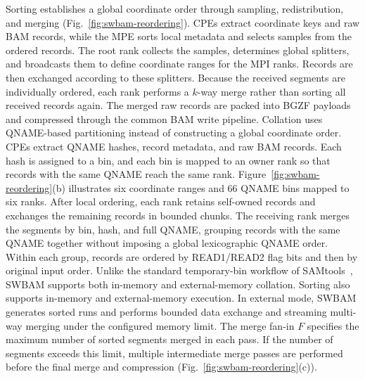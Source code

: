 \documentclass[lettersize,journal]{IEEEtran}
\begin{document}
Sorting establishes a global coordinate order through sampling, redistribution, and merging (Fig.~\ref{fig:swbam-reordering}).
CPEs extract coordinate keys and raw BAM records, while the MPE sorts local metadata and selects samples from the ordered records.
The root rank collects the samples, determines global splitters, and broadcasts them to define coordinate ranges for the MPI ranks.
Records are then exchanged according to these splitters.
Because the received segments are individually ordered, each rank performs a $k$-way merge rather than sorting all received records again.
The merged raw records are packed into BGZF payloads and compressed through the common BAM write pipeline.
Collation uses QNAME-based partitioning instead of constructing a global coordinate order.
CPEs extract QNAME hashes, record metadata, and raw BAM records.
Each hash is assigned to a bin, and each bin is mapped to an owner rank so that records with the same QNAME reach the same rank.
Figure~\ref{fig:swbam-reordering}(b) illustrates six coordinate ranges and 66 QNAME bins mapped to six ranks.
After local ordering, each rank retains self-owned records and exchanges the remaining records in bounded chunks.
The receiving rank merges the segments by bin, hash, and full QNAME, grouping records with the same QNAME together without imposing a global lexicographic QNAME order.
Within each group, records are ordered by READ1/READ2 flag bits and then by original input order.
Unlike the standard temporary-bin workflow of SAMtools~\cite{danecek2021samtools}, SWBAM supports both in-memory and external-memory collation.
Sorting also supports in-memory and external-memory execution.
In external mode, SWBAM generates sorted runs and performs bounded data exchange and streaming multi-way merging under the configured memory limit.
The merge fan-in \(F\) specifies the maximum number of sorted segments merged in each pass. 
If the number of segments exceeds this limit, multiple intermediate merge passes are performed before the final merge and compression (Fig.~\ref{fig:swbam-reordering}(c)).
\end{document}
